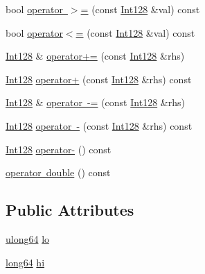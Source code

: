 \begin{DoxyCompactItemize}
bool \mbox{\hyperlink{class_clipper_lib_1_1_int128_a54419dd93804b83dabb20f7962c6fbf7}{operator $>$=}} (const \mbox{\hyperlink{class_clipper_lib_1_1_int128}{Int128}} \&val) const
\item 
bool \mbox{\hyperlink{class_clipper_lib_1_1_int128_ab3667a2abe7b05841b8004496e4e5ddd}{operator$<$=}} (const \mbox{\hyperlink{class_clipper_lib_1_1_int128}{Int128}} \&val) const
\item 
\mbox{\hyperlink{class_clipper_lib_1_1_int128}{Int128}} \& \mbox{\hyperlink{class_clipper_lib_1_1_int128_ad48a700134ab5c4e08bd53966b731950}{operator+=}} (const \mbox{\hyperlink{class_clipper_lib_1_1_int128}{Int128}} \&rhs)
\item 
\mbox{\hyperlink{class_clipper_lib_1_1_int128}{Int128}} \mbox{\hyperlink{class_clipper_lib_1_1_int128_ad32b1394a82ddf0d9f7da299b91212bd}{operator+}} (const \mbox{\hyperlink{class_clipper_lib_1_1_int128}{Int128}} \&rhs) const
\item 
\mbox{\hyperlink{class_clipper_lib_1_1_int128}{Int128}} \& \mbox{\hyperlink{class_clipper_lib_1_1_int128_ac9e4f8071a67423ec19759d60ff00730}{operator -\/=}} (const \mbox{\hyperlink{class_clipper_lib_1_1_int128}{Int128}} \&rhs)
\item 
\mbox{\hyperlink{class_clipper_lib_1_1_int128}{Int128}} \mbox{\hyperlink{class_clipper_lib_1_1_int128_ae983529021a512ecbd345148936a2d02}{operator -\/}} (const \mbox{\hyperlink{class_clipper_lib_1_1_int128}{Int128}} \&rhs) const
\item 
\mbox{\hyperlink{class_clipper_lib_1_1_int128}{Int128}} \mbox{\hyperlink{class_clipper_lib_1_1_int128_a10758b3c62928c3ed45298465b43992c}{operator-\/}} () const
\item 
\mbox{\hyperlink{class_clipper_lib_1_1_int128_aff43efe690619303c4b0a513834d5296}{operator double}} () const
\end{DoxyCompactItemize}
\subsection*{Public Attributes}
\begin{DoxyCompactItemize}
\item 
\mbox{\hyperlink{namespace_clipper_lib_a031fec5e97eb7e08708f1cafa53a232d}{ulong64}} \mbox{\hyperlink{class_clipper_lib_1_1_int128_a991b9da6e53c777a94fca640e505b258}{lo}}
\item 
\mbox{\hyperlink{namespace_clipper_lib_a7fd564bf34d174b6c96e07d01e5e7a0a}{long64}} \mbox{\hyperlink{class_clipper_lib_1_1_int128_a167643d0860a14fb563e055511e15e14}{hi}}
\end{DoxyCompactItemize}


